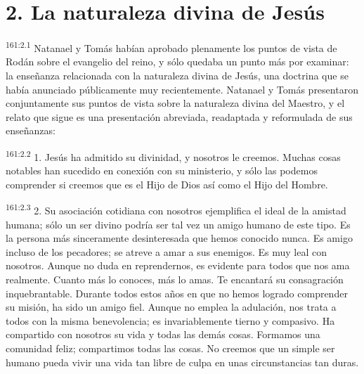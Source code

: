 \section*{2. La naturaleza divina de Jesús}
\par 
\textsuperscript{161:2.1} Natanael y Tomás habían aprobado plenamente los puntos de vista de Rodán sobre el evangelio del reino, y sólo quedaba un punto más por examinar: la enseñanza relacionada con la naturaleza divina de Jesús, una doctrina que se había anunciado públicamente muy recientemente. Natanael y Tomás presentaron conjuntamente sus puntos de vista sobre la naturaleza divina del Maestro, y el relato que sigue es una presentación abreviada, readaptada y reformulada de sus enseñanzas:

\par 
\textsuperscript{161:2.2} 1. Jesús ha admitido su divinidad, y nosotros le creemos. Muchas cosas notables han sucedido en conexión con su ministerio, y sólo las podemos comprender si creemos que es el Hijo de Dios así como el Hijo del Hombre.

\par 
\textsuperscript{161:2.3} 2. Su asociación cotidiana con nosotros ejemplifica el ideal de la amistad humana; sólo un ser divino podría ser tal vez un amigo humano de este tipo. Es la persona más sinceramente desinteresada que hemos conocido nunca. Es amigo incluso de los pecadores; se atreve a amar a sus enemigos. Es muy leal con nosotros. Aunque no duda en reprendernos, es evidente para todos que nos ama realmente. Cuanto más lo conoces, más lo amas. Te encantará su consagración inquebrantable. Durante todos estos años en que no hemos logrado comprender su misión, ha sido un amigo fiel. Aunque no emplea la adulación, nos trata a todos con la misma benevolencia; es invariablemente tierno y compasivo. Ha compartido con nosotros su vida y todas las demás cosas. Formamos una comunidad feliz; compartimos todas las cosas. No creemos que un simple ser humano pueda vivir una vida tan libre de culpa en unas circunstancias tan duras.

